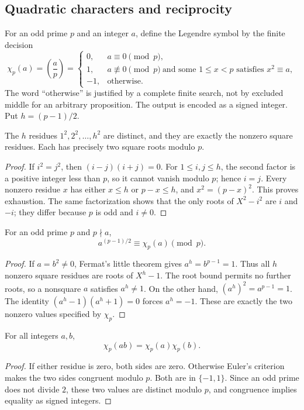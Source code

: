 \subsection{Quadratic characters and reciprocity}

For an odd prime $p$ and an integer $a$, define the Legendre symbol by
the finite decision
\[
 \chi_p(a)=\left(\frac ap\right)=
 \begin{cases}
 0,&a\equiv0\pmod p,\\
 1,&a\not\equiv0\pmod p\ \text{and some }1\le x<p\text{ satisfies }x^2\equiv a,\\
 -1,&\text{otherwise}.
 \end{cases}
\]
The word ``otherwise'' is justified by a complete finite search, not by
excluded middle for an arbitrary proposition. The output is encoded as a
signed integer. Put $h=(p-1)/2$.

\begin{lemma}\label{qr:squares-half}
The $h$ residues $1^2,2^2,\ldots,h^2$ are distinct, and they are
exactly the nonzero square residues. Each has precisely two square roots
modulo $p$.
\end{lemma}
\begin{proof}
If $i^2=j^2$, then $(i-j)(i+j)=0$. For $1\le i,j\le h$, the second
factor is a positive integer less than $p$, so it cannot vanish modulo
$p$; hence $i=j$. Every nonzero residue $x$ has either $x\le h$ or
$p-x\le h$, and $x^2=(p-x)^2$. This proves exhaustion. The same
factorization shows that the only roots of $X^2-i^2$ are $i$ and $-i$;
they differ because $p$ is odd and $i\ne0$.
\end{proof}

\begin{theorem}\label{qr:euler-criterion}
For an odd prime $p$ and $p\nmid a$,
\[
 a^{(p-1)/2}\equiv\chi_p(a)\pmod p.
\]
\end{theorem}
\begin{proof}
If $a=b^2\ne0$, Fermat's little theorem gives $a^h=b^{p-1}=1$.
Thus all $h$ nonzero square residues are roots of $X^h-1$. The root
bound permits no further roots, so a nonsquare $a$ satisfies $a^h\ne1$.
On the other hand, $(a^h)^2=a^{p-1}=1$. The identity
$(a^h-1)(a^h+1)=0$ forces $a^h=-1$. These are exactly the two
nonzero values specified by $\chi_p$.
\end{proof}

\begin{corollary}[Multiplicativity]\label{qr:character}
For all integers $a,b$,
\[
 \chi_p(ab)=\chi_p(a)\chi_p(b).
\]
\end{corollary}
\begin{proof}
If either residue is zero, both sides are zero. Otherwise Euler's criterion
makes the two sides congruent modulo $p$. Both are in $\{-1,1\}$.
Since an odd prime does not divide $2$, these two values are distinct
modulo $p$, and congruence implies equality as signed integers.
\end{proof}

